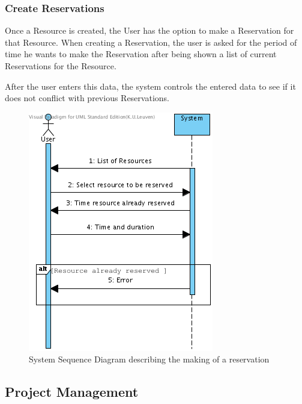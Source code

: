			\subsubsection{Create Reservations}
			Once a Resource is created, the User has the option to make a Reservation for that Resource.
			When creating a Reservation, the user is asked for the period of time he wants to make the Reservation after being shown a list of current Reservations for the Resource.

			After the user enters this data, the system controls the entered data to see if it does not conflict with previous Reservations.
			\begin{figure}[H]
				\begin{center}
					\includegraphics[scale=0.5]{images/SSD_Make_Resource_Reservation.png}
				\end{center}
				\caption{System Sequence Diagram describing the making of a reservation}
			\end{figure}
		\subsection{Project Management}
